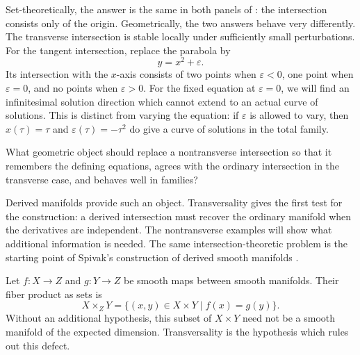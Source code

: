 Set-theoretically, the answer is the same in both panels of
: the intersection consists only of the origin.
Geometrically, the two answers behave very differently. The transverse
intersection is stable locally under sufficiently small perturbations. For the
tangent intersection, replace the parabola by
\[
  y=x^2+\varepsilon.
\]
Its intersection with the $x$-axis consists of two points when
$\varepsilon<0$, one point when $\varepsilon=0$, and no points when
$\varepsilon>0$. For the fixed equation at $\varepsilon=0$, we will find an
infinitesimal solution direction which cannot extend to an actual curve of
solutions. This is distinct from varying the equation: if $\varepsilon$ is
allowed to vary, then $x(\tau)=\tau$ and $\varepsilon(\tau)=-\tau^2$ do give
a curve of solutions in the total family.

\begin{question*}
  What geometric object should replace a nontransverse intersection so that it
  remembers the defining equations, agrees with the ordinary intersection in
  the transverse case, and behaves well in families?
\end{question*}

Derived manifolds provide such an object. Transversality gives the first
test for the construction: a derived intersection must recover the ordinary
manifold when the derivatives are independent. The nontransverse examples
will show what additional information is needed.
The same intersection-theoretic problem is the starting point of Spivak's
construction of derived smooth manifolds
\cite[Sections~1--3]{Spivak_Derived_Smooth_Manifolds}.

Let $f\colon X\to Z$ and $g\colon Y\to Z$ be smooth maps between smooth
manifolds. Their fiber product as sets is
\[
  X\times_ZY
  =\{(x,y)\in X\times Y\mid f(x)=g(y)\}.
\]
Without an additional hypothesis, this subset of $X\times Y$ need not be a
smooth manifold of the expected dimension. Transversality is the hypothesis
which rules out this defect.


